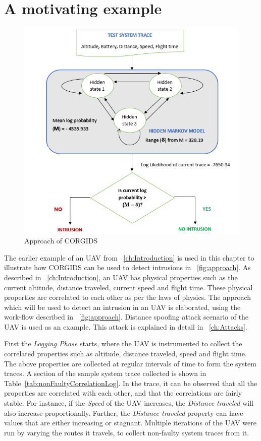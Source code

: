 \section{A motivating example}

\begin{figure}[ht]
    \centering
    \includegraphics[scale=0.75,keepaspectratio = true]{Graphics/CORGIDSApproach.png}
    \caption{Approach of CORGIDS}
    \label{fig:approach}
\end{figure}

The earlier example of an \ac{UAV} from ~\autoref{ch:Introduction} is used in this chapter to illustrate how \ac{CORGIDS} can be used to detect intrusions in ~\autoref{fig:approach}. As described in ~\autoref{ch:Introduction}, an \ac{UAV} has physical properties such as the current altitude, distance traveled, current speed and flight time. These physical properties are correlated to each other as per the laws of physics. The approach which will be used to detect an intrusion in an \ac{UAV} is elaborated, using the work-flow described in ~\autoref{fig:approach}. Distance spoofing attack scenario of the \ac{UAV} is used as an example. This attack is explained in detail in ~\autoref{ch:Attacks}.

First the \textit{Logging Phase} starts, where the \ac{UAV} is instrumented to collect the correlated properties such as altitude, distance traveled, speed and flight time. The above properties are collected at regular intervals of time to form the system traces. A section of the sample system trace collected is shown in Table~\ref{tab:nonFaultyCorrelationLog}. In the trace, it can be observed that all the properties are correlated  with each other, and that the correlations are fairly stable. For instance, if the \textit{Speed} of the \ac{UAV} increases, the \textit{Distance traveled} will also increase proportionally. Further, the \textit{Distance traveled} property can have values that are either increasing or stagnant. Multiple iterations of the \ac{UAV} were run by varying the routes it travels, to collect non-faulty system traces from it.


